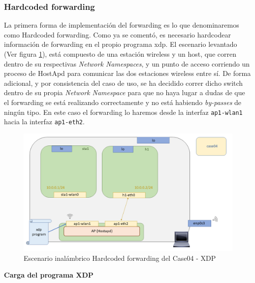 \subsubsection{Hardcoded forwarding}
\label{xdp_wifi_case04_hard}

La primera forma de implementación del forwarding es lo que denominaremos como Hardcoded forwarding. Como ya se comentó, es necesario hardcodear información de forwarding en el propio programa \gls{xdp}. El escenario levantado (Ver figura \ref{fig:case04_xdp_wifi_scenario}), está compuesto de una estación wireless y un host, que corren dentro de su respectivas \textit{Network Namespaces}, y un punto de acceso corriendo un proceso de HostApd para comunicar las dos estaciones wireless entre sí. De forma adicional, y por consistencia del caso de uso, se ha decidido correr dicho switch dentro de su propia \textit{Network Namespace} para que no haya lugar a dudas de que el forwarding se está realizando correctamente y no está habiendo \textit{by-passes} de ningún tipo. En este caso el forwarding lo haremos desde la interfaz \texttt{ap1-wlan1} hacia la interfaz \texttt{ap1-eth2}.\\
\par

\begin{figure}[ht]
    \centering
    \includegraphics[width=14cm]{archivos/img/dev/xdp-wifi/case04/scenario.png}
    \caption{Escenario inalámbrico Hardcoded forwarding del Case04 - XDP}
    \label{fig:case04_xdp_wifi_scenario}
\end{figure}


\vspace{0.5cm}
\textbf{Carga del programa XDP}\\
\par

